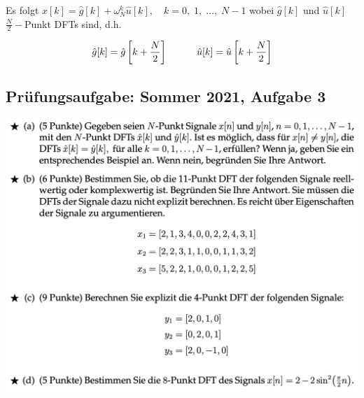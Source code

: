 \documentclass[11pt]{article}
\begin{document}
Es folgt $\hat{x}[k] = \hat{g}[k] + \omega_N^k \hat{u}[k], \hspace{12pt} k = 0, \; 1, \; \dots, \; N-1$ wobei $\hat{g}[k]$ und $\hat{u}[k]$ $\frac{N}{2}-$Punkt DFTs sind, d.h.

$$\hat{g}[k] = \hat{g}\left[k + \frac{N}{2}\right] \hspace*{30pt} \hat{u}[k] = \hat{u}\left[k + \frac{N}{2}\right]$$

\subsection*{Prüfungsaufgabe: Sommer 2021, Aufgabe 3}
\vspace*{-0.5cm}
\includegraphics[width=\linewidth]{docimgs/Sommer21_3.png}

\pagebreak


\pagebreak


\pagebreak
\end{document}
